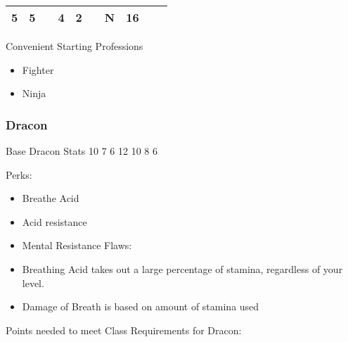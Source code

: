 \documentclass[12pt]{article}
\begin{document}
\begin{longtable}[]{@{}llllllllll@{}}
\begin{minipage}[t]{0.06\columnwidth}
5
\strut\end{minipage} &
\begin{minipage}[t]{0.06\columnwidth}\raggedright\strut
5
\strut\end{minipage} &
\begin{minipage}[t]{0.06\columnwidth}\raggedright\strut
\strut\end{minipage} &
\begin{minipage}[t]{0.06\columnwidth}\raggedright\strut
4
\strut\end{minipage} &
\begin{minipage}[t]{0.06\columnwidth}\raggedright\strut
2
\strut\end{minipage} &
\begin{minipage}[t]{0.06\columnwidth}\raggedright\strut
\strut\end{minipage} &
\begin{minipage}[t]{0.07\columnwidth}\raggedright\strut
N
\strut\end{minipage} &
\begin{minipage}[t]{0.08\columnwidth}\raggedright\strut
16
\strut\end{minipage}\tabularnewline
\bottomrule
\end{longtable}

Convenient Starting Professions

\begin{itemize}
\item
  Fighter
\item
  Ninja
\end{itemize}

\subsubsection{Dracon}\label{dracon}

Base Dracon Stats 10 7 6 12 10 8 6

Perks:

\begin{itemize}
\item
  Breathe Acid
\item
  Acid resistance
\item
  Mental Resistance Flaws:
\item
  Breathing Acid takes out a large percentage of stamina, regardless of
  your level.
\item
  Damage of Breath is based on amount of stamina used
\end{itemize}

Points needed to meet Class Requirements for Dracon:
\end{document}
